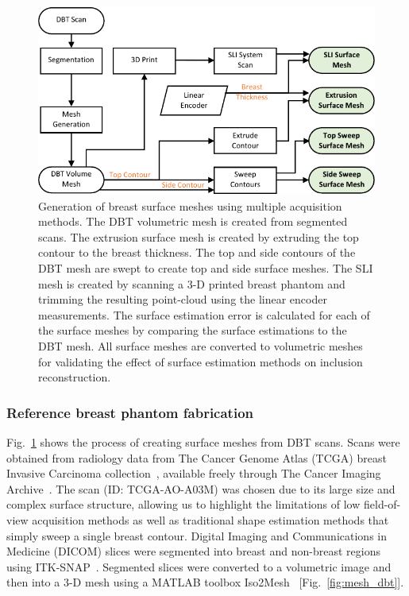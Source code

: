 \begin{figure}
    \begin{center}
    \includegraphics[width=.9\textwidth]{fig/omci/mesh_flowchart2.pdf}
    \end{center}
    \caption{Generation of breast surface meshes using multiple acquisition methods. The DBT volumetric mesh is created from segmented scans. The extrusion surface mesh is created by extruding the top contour to the breast thickness. The top and side contours of the DBT mesh are swept to create top and side surface meshes. The SLI mesh is created by scanning a 3-D printed breast phantom and trimming the resulting point-cloud using the linear encoder measurements. The surface estimation error is calculated for each of the surface meshes by comparing the surface estimations to the DBT mesh. All surface meshes are converted to volumetric meshes for validating the effect of surface estimation methods on inclusion reconstruction.}
    \label{fig:mesh_flowchart}
\end{figure} 

\subsubsection{Reference breast phantom fabrication}
Fig.~\ref{fig:mesh_flowchart} shows the process of creating surface meshes from DBT scans. Scans were obtained from radiology data from The Cancer Genome Atlas (TCGA) breast Invasive Carcinoma collection~\cite{Lingle2016}, available freely through The Cancer Imaging Archive~\cite{Clark2013}. The scan (ID: TCGA-AO-A03M) was chosen due to its large size and complex surface structure, allowing us to highlight the limitations of low field-of-view acquisition methods as well as traditional shape estimation methods that simply sweep a single breast contour.  Digital Imaging and Communications in Medicine (DICOM) slices were segmented into breast and non-breast regions using ITK-SNAP~\cite{Yushkevich2006}. Segmented slices were converted to a volumetric image and then into a 3-D mesh using a MATLAB toolbox Iso2Mesh~\cite{Fang2009} [Fig.~\ref{fig:mesh_dbt}].

